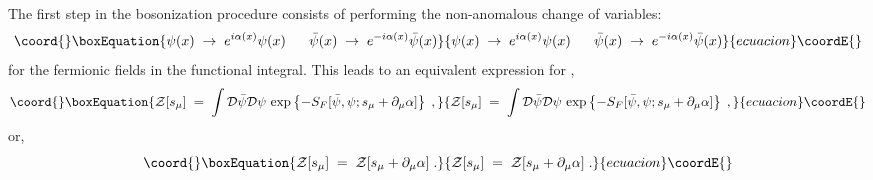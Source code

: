 \documentclass[a4paper,12pt]{article}
\begin{document}
The first step in the bosonization procedure consists of performing
the non-anomalous change of variables:
\begin{equation}\coord{}\boxEquation{
  \label{eq:stp1}
  \psi(x) \;\to\; e^{i \alpha (x)} \psi(x) \;\;\;\;\;\; {\bar\psi}(x)
  \;\to\; e^{-i \alpha (x)} {\bar\psi}(x)
}{
  \psi(x) \;\to\; e^{i \alpha (x)} \psi(x) \;\;\;\;\;\; {\bar\psi}(x)
  \;\to\; e^{-i \alpha (x)} {\bar\psi}(x)
}{ecuacion}\coordE{}\end{equation}
for the fermionic fields in the functional integral. This leads to an
equivalent expression for \coordHE{},
\begin{equation}\coord{}\boxEquation{
  \label{eq:stp2}
 {\mathcal Z}[s_\mu] \;=\; \int {\mathcal D}{\bar\psi} {\mathcal
    D}\psi \, \exp \left\{- S_F[{\bar\psi},\psi; s_\mu + \partial_\mu \alpha] \right\} \;,
}{
  {\mathcal Z}[s_\mu] \;=\; \int {\mathcal D}{\bar\psi} {\mathcal
    D}\psi \, \exp \left\{- S_F[{\bar\psi},\psi; s_\mu + \partial_\mu \alpha] \right\} \;,
}{ecuacion}\coordE{}\end{equation}
or,
\begin{equation}\coord{}\boxEquation{
  \label{eq:stp2a}
 {\mathcal Z}[s_\mu] \;=\; {\mathcal Z}[s_\mu + \partial_\mu \alpha] \;.
}{
  {\mathcal Z}[s_\mu] \;=\; {\mathcal Z}[s_\mu + \partial_\mu \alpha] \;.
}{ecuacion}\coordE{}\end{equation}
\end{document}
